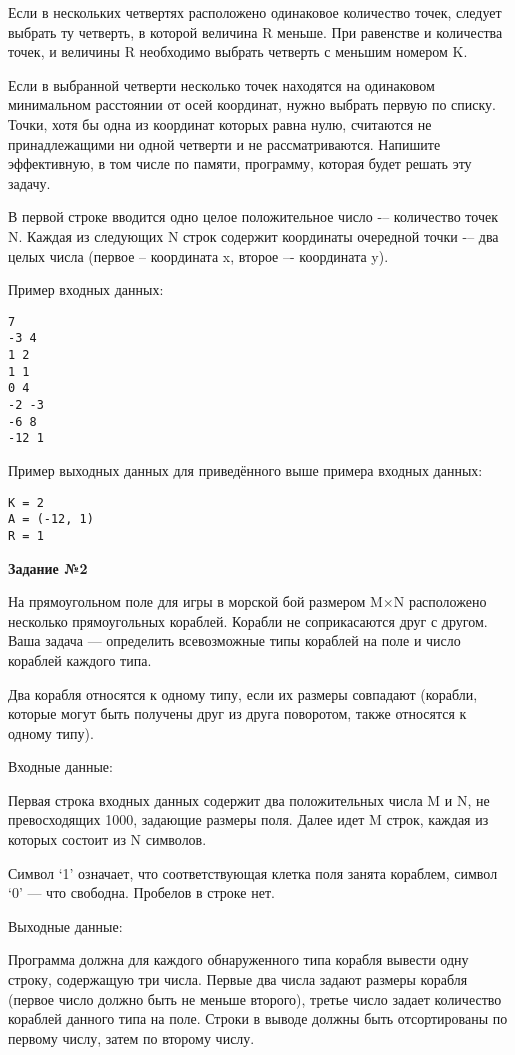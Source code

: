 Если в нескольких четвертях расположено одинаковое количество точек, следует выбрать ту четверть, в которой величина R меньше. При равенстве и количества точек, и величины R необходимо выбрать четверть с меньшим номером K. 

Если в выбранной четверти несколько точек находятся на одинаковом минимальном расстоянии от осей координат, нужно выбрать первую по списку. Точки, хотя бы одна из координат которых равна нулю, считаются не принадлежащими ни одной четверти и не рассматриваются. Напишите эффективную, в том числе по памяти, программу, которая будет решать эту задачу.

В первой строке вводится одно целое положительное число -– количество точек N. Каждая из следующих N строк содержит координаты очередной точки -– два целых числа (первое – координата x, второе –- координата y).

Пример входных данных:
\begin{verbatim}
7
-3 4
1 2
1 1
0 4
-2 -3
-6 8
-12 1
\end{verbatim}

Пример выходных данных для приведённого выше примера входных данных:
\begin{verbatim}
K = 2
A = (-12, 1)
R = 1
\end{verbatim}


{\bf Задание №2}

На прямоугольном поле для игры в морской бой размером M×N расположено несколько прямоугольных кораблей. Корабли не соприкасаются друг с другом. Ваша задача — определить всевозможные типы кораблей на поле и число кораблей каждого типа. 

Два корабля относятся к одному типу, если их размеры совпадают (корабли, которые могут быть получены друг из друга поворотом, также относятся к одному типу).

Входные данные:

Первая строка входных данных содержит два положительных числа M и N, не превосходящих 1000, задающие размеры поля. Далее идет M строк, каждая из которых состоит из N символов. 

Символ `1' означает, что соответствующая клетка поля занята кораблем, символ `0' — что свободна. Пробелов в строке нет.

Выходные данные:

Программа должна для каждого обнаруженного типа корабля вывести одну строку, содержащую три числа. Первые два числа задают размеры корабля (первое число должно быть не меньше второго), 
третье число задает количество кораблей данного типа на поле. Строки в выводе должны быть отсортированы по первому числу, затем по второму числу.

